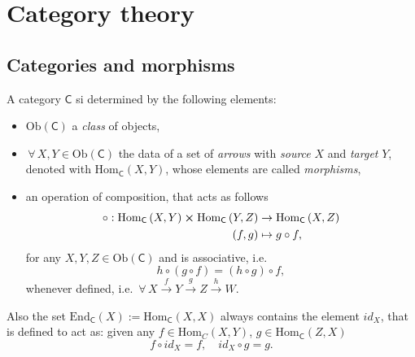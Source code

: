 \section{Category theory}

\subsection{Categories and morphisms}

\begin{defn}[Category]
	A category $\mathsf{C}$ si determined by the following elements:
	\begin{itemize}
		\item $\mathrm{Ob}(\mathsf{C})$ a {\em class} of objects,
		\item $\,\forall\, X,Y \in \mathrm{Ob}(\mathsf{C})$ the data of a set of {\em arrows}  with {\em source} $X$ and {\em target} $Y$, denoted with $\mathrm{Hom}_{\mathsf{C}} \left( X, Y \right)$, whose elements are called {\em morphisms},
		\item an operation of composition, that acts as follows
			\begin{align}
				\circ: \mathrm{Hom}_{\mathsf{C}} \left( X, Y \right) \cross \mathrm{Hom}_{\mathsf{C}} \left( Y, Z \right) &\to \mathrm{Hom}_{\mathsf{C}} \left( X, Z \right)\\
				\left(f, g\right) &\mapsto g \circ f
			,\end{align} 
			for any $X,Y,Z \in \mathrm{Ob}(\mathsf{C})$ and is associative, i.e.
			\begin{equation}
				h \circ (g \circ f) = (h \circ g) \circ f
			,\end{equation} 
			whenever defined, i.e. $\,\forall\, X \xrightarrow{f} Y \xrightarrow{g} Z \xrightarrow{h} W$.
	\end{itemize}
	Also the set $\mathrm{End}_{\mathsf{C}}\left(X\right) := \mathrm{Hom}_{\mathsf{C}} \left( X, X \right)$ always contains the element $id_X$, that is defined to act as: given any $f \in \mathrm{Hom}_{C} \left( X, Y \right)$, $g \in \mathrm{Hom}_{\mathsf{C}} \left( Z, X \right)$ 
	\begin{equation}
	f \circ id_X = f, \quad id_X \circ g = g
	.\end{equation} 
\end{defn}

